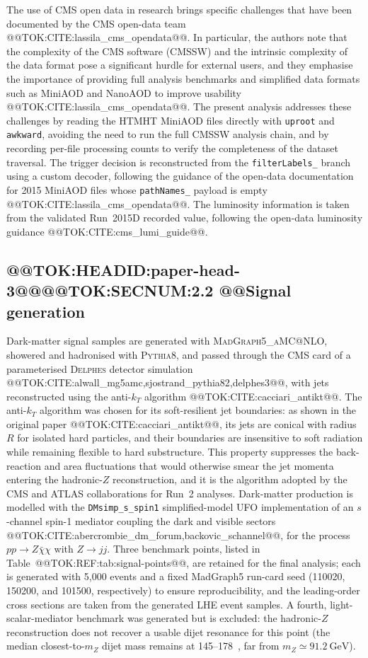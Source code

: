 \documentclass[11pt]{article}
\newcommand{\GeV}{\text{GeV}}
\begin{document}
The use of CMS open data in research brings specific challenges that have
been documented by the CMS open-data team @@TOK:CITE:lassila_cms_opendata@@.
In particular, the authors note that the complexity of the CMS software
(CMSSW) and the intrinsic complexity of the data format pose a significant
hurdle for external users, and they emphasise the importance of providing
full analysis benchmarks and simplified data formats such as MiniAOD and
NanoAOD to improve usability @@TOK:CITE:lassila_cms_opendata@@. The present
analysis addresses these challenges by reading the HTMHT MiniAOD files
directly with \texttt{uproot} and \texttt{awkward}, avoiding the need to
run the full CMSSW analysis chain, and by recording per-file processing
counts to verify the completeness of the dataset traversal. The trigger
decision is reconstructed from the \texttt{filterLabels\_} branch using a
custom decoder, following the guidance of the open-data documentation for
2015 MiniAOD files whose \texttt{pathNames\_} payload is empty
@@TOK:CITE:lassila_cms_opendata@@. The luminosity information is taken from the
validated Run~2015D recorded value, following the open-data luminosity
guidance @@TOK:CITE:cms_lumi_guide@@.

\subsection{@@TOK:HEADID:paper-head-3@@@@TOK:SECNUM:2.2 @@Signal generation}

Dark-matter signal samples are generated with \textsc{MadGraph5\_aMC@NLO},
showered and hadronised with \textsc{Pythia8}, and passed through the CMS
card of a parameterised \textsc{Delphes} detector simulation
@@TOK:CITE:alwall_mg5amc,sjostrand_pythia82,delphes3@@, with jets reconstructed
using the anti-$k_T$ algorithm @@TOK:CITE:cacciari_antikt@@. The anti-$k_T$
algorithm was chosen for its soft-resilient jet boundaries: as shown in the
original paper @@TOK:CITE:cacciari_antikt@@, its jets are conical with radius $R$
for isolated hard particles, and their boundaries are insensitive to soft
radiation while remaining flexible to hard substructure. This property
suppresses the back-reaction and area fluctuations that would otherwise
smear the jet momenta entering the hadronic-$Z$ reconstruction, and it is
the algorithm adopted by the CMS and ATLAS collaborations for Run~2
analyses. Dark-matter production is modelled with the
\texttt{DMsimp\_s\_spin1} simplified-model UFO implementation of an
$s$-channel spin-1 mediator coupling the dark and visible sectors
@@TOK:CITE:abercrombie_dm_forum,backovic_schannel@@, for the process
$pp \to Z\bar{\chi}\chi$ with $Z \to jj$. Three benchmark points,
listed in Table~@@TOK:REF:tab:signal-points@@, are retained for the final
analysis; each is generated with 5{,}000 events and a fixed MadGraph5
run-card seed (110020, 150200, and 101500, respectively) to ensure
reproducibility, and the leading-order cross sections are taken from the
generated LHE event samples. A fourth, light-scalar-mediator benchmark was
generated but is excluded: the hadronic-$Z$ reconstruction does not recover
a usable dijet resonance for this point (the median closest-to-$m_Z$ dijet
mass remains at 145--178~\GeV, far from $m_Z \simeq 91.2~\GeV$).
\end{document}
